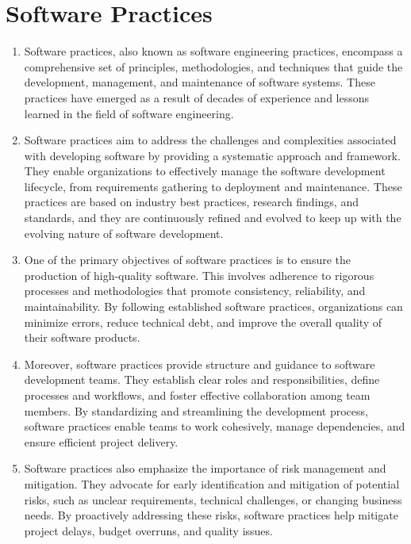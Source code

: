 \section*{Software Practices}

\begin{enumerate}
    \item Software practices, also known as software engineering practices, encompass a comprehensive set of principles, methodologies, and techniques that guide the development, management, and maintenance of software systems. These practices have emerged as a result of decades of experience and lessons learned in the field of software engineering.

    \item Software practices aim to address the challenges and complexities associated with developing software by providing a systematic approach and framework. They enable organizations to effectively manage the software development lifecycle, from requirements gathering to deployment and maintenance. These practices are based on industry best practices, research findings, and standards, and they are continuously refined and evolved to keep up with the evolving nature of software development.

    \item One of the primary objectives of software practices is to ensure the production of high-quality software. This involves adherence to rigorous processes and methodologies that promote consistency, reliability, and maintainability. By following established software practices, organizations can minimize errors, reduce technical debt, and improve the overall quality of their software products.

    \item Moreover, software practices provide structure and guidance to software development teams. They establish clear roles and responsibilities, define processes and workflows, and foster effective collaboration among team members. By standardizing and streamlining the development process, software practices enable teams to work cohesively, manage dependencies, and ensure efficient project delivery.

    \item Software practices also emphasize the importance of risk management and mitigation. They advocate for early identification and mitigation of potential risks, such as unclear requirements, technical challenges, or changing business needs. By proactively addressing these risks, software practices help mitigate project delays, budget overruns, and quality issues.


\end{enumerate}
